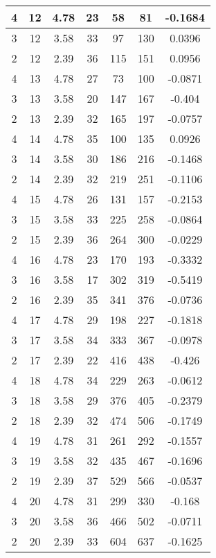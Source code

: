 \documentclass[letterpaper, 12pt]{article}
\begin{document}
\begin{longtable}{|c|c|c|c|c|c|c|}
\hline
4 & 12 & 4.78 & 23 & 58 & 81 & -0.1684 \\
\hline
3 & 12 & 3.58 & 33 & 97 & 130 & 0.0396 \\
\hline
2 & 12 & 2.39 & 36 & 115 & 151 & 0.0956 \\
\hline
4 & 13 & 4.78 & 27 & 73 & 100 & -0.0871 \\
\hline
3 & 13 & 3.58 & 20 & 147 & 167 & -0.404 \\
\hline
2 & 13 & 2.39 & 32 & 165 & 197 & -0.0757 \\
\hline
4 & 14 & 4.78 & 35 & 100 & 135 & 0.0926 \\
\hline
3 & 14 & 3.58 & 30 & 186 & 216 & -0.1468 \\
\hline
2 & 14 & 2.39 & 32 & 219 & 251 & -0.1106 \\
\hline
4 & 15 & 4.78 & 26 & 131 & 157 & -0.2153 \\
\hline
3 & 15 & 3.58 & 33 & 225 & 258 & -0.0864 \\
\hline
2 & 15 & 2.39 & 36 & 264 & 300 & -0.0229 \\
\hline
4 & 16 & 4.78 & 23 & 170 & 193 & -0.3332 \\
\hline
3 & 16 & 3.58 & 17 & 302 & 319 & -0.5419 \\
\hline
2 & 16 & 2.39 & 35 & 341 & 376 & -0.0736 \\
\hline
4 & 17 & 4.78 & 29 & 198 & 227 & -0.1818 \\
\hline
3 & 17 & 3.58 & 34 & 333 & 367 & -0.0978 \\
\hline
2 & 17 & 2.39 & 22 & 416 & 438 & -0.426 \\
\hline
4 & 18 & 4.78 & 34 & 229 & 263 & -0.0612 \\
\hline
3 & 18 & 3.58 & 29 & 376 & 405 & -0.2379 \\
\hline
2 & 18 & 2.39 & 32 & 474 & 506 & -0.1749 \\
\hline
4 & 19 & 4.78 & 31 & 261 & 292 & -0.1557 \\
\hline
3 & 19 & 3.58 & 32 & 435 & 467 & -0.1696 \\
\hline
2 & 19 & 2.39 & 37 & 529 & 566 & -0.0537 \\
\hline
4 & 20 & 4.78 & 31 & 299 & 330 & -0.168 \\
\hline
3 & 20 & 3.58 & 36 & 466 & 502 & -0.0711 \\
\hline
2 & 20 & 2.39 & 33 & 604 & 637 & -0.1625 \\
\hline
\end{longtable}
\end{document}
